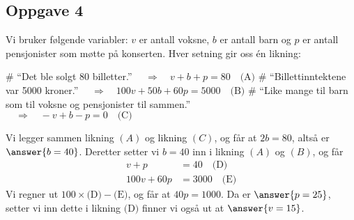 \subsection*{Oppgave 4}
Vi bruker følgende variabler: $v$ er antall voksne, $b$ er antall barn og $p$ er antall pensjonister som møtte på konserten.
Hver setning gir oss én likning:
\begin{easylist}[itemize]
	# ``Det ble solgt 80 billetter.'' $\quad \Rightarrow \quad v + b + p = 80 \quad \text{(A)}$
	# ``Billettinntektene var 5000 kroner.'' 
	$\quad \Rightarrow \quad 100v + 50b + 60p = 5000 \quad \text{(B)}$
	# ``Like mange til barn som til voksne og pensjonister til sammen.'' \\ $\quad \Rightarrow \quad - v + b - p = 0 \quad \text{(C)}$
\end{easylist}
Vi legger sammen likning $(A)$ og likning $(C)$, og får at $2b = 80$,
altså er $\answer{b=40}$.
Deretter setter vi $b = 40$ inn i likning $(A)$ og $(B)$, og får
\begin{align*}
	v + p &= 40 \quad \text{(D)}\\
	100v  + 60p &= 3000\quad \text{(E)}
\end{align*}
Vi regner ut $100 \times \text{(D)} - \text{(E)}$, og får at $40p = 1000$.
Da er $\answer{p = 25}$, setter vi inn dette i likning $\text{(D)}$ finner vi også ut at $\answer{v = 15}$.



